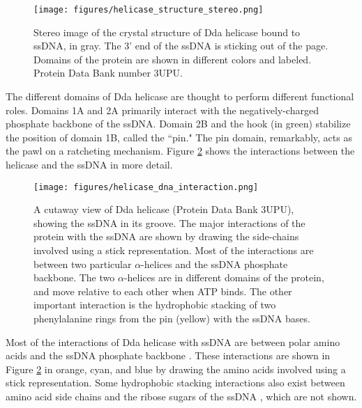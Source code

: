 \begin{figure}[h]
\begin{centering}
\texttt{[image: figures/helicase\_structure\_stereo.png]}
\caption[Dda helicase structure]{Stereo image of the crystal structure of Dda helicase bound to ssDNA, in gray.  The 3' end of the ssDNA is sticking out of the page.  Domains of the protein are shown in different colors and labeled.  Protein Data Bank number 3UPU. \citep{He2012}}
\label{fig:helicase_stereo}
\end{centering}
\end{figure}

The different domains of Dda helicase are thought to perform different functional roles.  Domains 1A and 2A primarily interact with the negatively-charged phosphate backbone of the ssDNA.  Domain 2B and the hook (in green) stabilize the position of domain 1B, called the ``pin."  The pin domain, remarkably, acts as the pawl on a ratcheting mechanism.  Figure \ref{fig:helicase_ssDNA_interactions} shows the interactions between the helicase and the ssDNA in more detail.

\begin{figure}[h]
\begin{centering}
\texttt{[image: figures/helicase\_dna\_interaction.png]}
\caption[Dda helicase: interactions with ssDNA]{A cutaway view of Dda helicase (Protein Data Bank 3UPU), showing the ssDNA in its groove.  The major interactions of the protein with the ssDNA are shown by drawing the side-chains involved using a stick representation.  Most of the interactions are between two particular $\alpha$-helices and the ssDNA phosphate backbone.  The two $\alpha$-helices are in different domains of the protein, and move relative to each other when ATP binds.  The other important interaction is the hydrophobic stacking of two phenylalanine rings from the pin (yellow) with the ssDNA bases.}
\label{fig:helicase_ssDNA_interactions}
\end{centering}
\end{figure}

Most of the interactions of Dda helicase with ssDNA are between polar amino acids and the ssDNA phosphate backbone \citep{He2012}.  These interactions are shown in Figure \ref{fig:helicase_ssDNA_interactions} in orange, cyan, and blue by drawing the amino acids involved using a stick representation.  Some hydrophobic stacking interactions also exist between amino acid side chains and the ribose sugars of the ssDNA \citep{He2012}, which are not shown.

